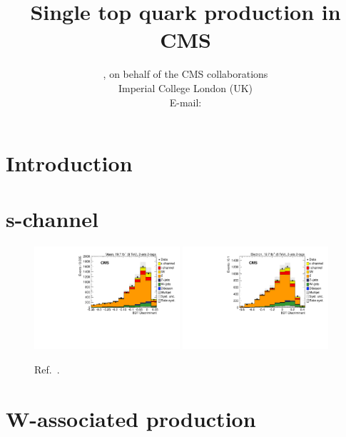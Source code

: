 \documentclass{PoS}
\title{Single top quark production in CMS}
\author{
    \speaker{Matthias Komm}, on behalf of the CMS collaborations\\
    Imperial College London (UK)\\
    E-mail: \email{Matthias.Komm@cern.ch}
}
\begin{document}
\section{Introduction}

\section{s-channel}

\begin{figure}[!htb]
\begin{center}
\includegraphics[width=0.48\textwidth]{sch1.pdf}\hspace{0.02\textwidth}
\includegraphics[width=0.48\textwidth]{sch2.pdf}
\caption{\label{fig:s-channel-bdt}Ref.~\cite{sch}.}
\end{center}
\end{figure}

\section{W-associated production}
\end{document}
